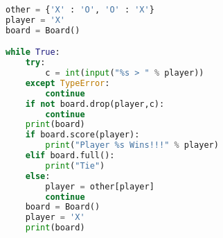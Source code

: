 \documentclass{article}
\begin{document}
{\begin{lstlisting}[language=python]
other = {'X' : 'O', 'O' : 'X'}
player = 'X'
board = Board()

while True:
	try:
		c = int(input("%s > " % player))
	except TypeError:
		continue
	if not board.drop(player,c):
		continue
	print(board)
	if board.score(player):
		print("Player %s Wins!!!" % player)
	elif board.full():
		print("Tie")
	else:
		player = other[player]
		continue
	board = Board()
	player = 'X'
	print(board)
\end{lstlisting}
}
\end{document}
